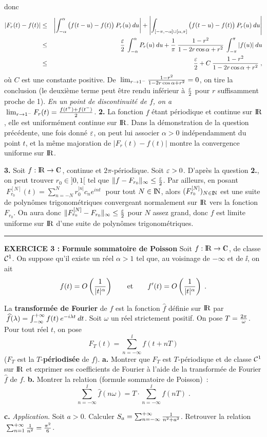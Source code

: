 \documentclass{article}
\begin{document}
donc\vv
\begin{eqnarray*}
|F_r(t)-f(t)| & \leq & \left|\int_{-\alpha}^{\alpha}\big(f(t-u)-f(t)\big)\>P_r(u)\>du\right|+\left|\int_{[-\pi,-\alpha]\cup[\alpha,\pi]}\big(f(t-u)-f(t)\big)\>P_r(u)\>du\right|\\
& \leq & {\varepsilon\over2}\>\int_{-\alpha}^{\alpha}P_r(u)\>du+{1\over\pi}\>{1-r^2\over1-2r\cos\alpha+r^2}\>\int_{-\pi}^{\pi}|f(u)|\>du\\
& \leq & {\varepsilon\over2}+C\>{1-r^2\over1-2r\cos\alpha+r^2}\;,
\end{eqnarray*}
o\`u $C$ est une constante positive. De $\;\lim_{r\rightarrow1^-}{1-r^2\over1-2r\cos\alpha+r^2}=0$, on tire la conclusion (le deuxi\`eme terme peut \^etre rendu inf\'erieur \`a ${\varepsilon\over2}$ pour $r$ suffisamment proche de 1).
\msk\sect
{\it En un point de discontinuit\'e de $f$, on a} $\;\lim_{r\rightarrow1^-}F_r(t)={f(t^+)+f(t^-)\over2}$.
\bsk
{\bf 2.} La fonction $f$ \'etant p\'eriodique et continue sur ${\rm I\kern-0.6mm R}$, elle est uniform\'ement continue sur ${\rm I\kern-0.6mm R}$. Dans la d\'emonstration de la question pr\'ec\'edente, une fois donn\'e $\varepsilon$, on peut lui associer $\alpha>0$ ind\'ependamment du point $t$, et la m\^eme majoration de $|F_r(t)-f(t)|$ montre la convergence uniforme sur ${\rm I\kern-0.6mm R}$.

\msk
{\bf 3.} Soit $f:\rmat\vers\cmat$, continue et $2\pi$-p\'eriodique. Soit $\varepsilon>0$. D'apr\`es la question {\bf 2.}, on peut trouver $r_0\in]0,1[$ tel que $\|f-F_{r_0}\|_{\infty}\leq{\varepsilon\over2}$. Par ailleurs, en posant $\;F_{r_0}^{[N]}(t)=\sum_{n=-N}^Nr_0^{|n|}c_ne^{int}\;$ pour tout $N\in{\rm I\kern-0.5mm N}$, alors $(F_{r_0}^{[N]})_{N\in{\rm I\kern-0.5mm N}}$ est une suite de polyn\^omes trigonom\'etriques convergeant normalement sur ${\rm I\kern-0.6mm R}$ vers la fonction $F_{r_0}$. On aura donc $\|F_{r_0}^{[N]}-F_{r_0}\|_{\infty}\leq{\varepsilon\over2}$ pour $N$ assez grand, donc $f$ est limite uniforme sur ${\rm I\kern-0.6mm R}$ d'une suite de polyn\^omes trigonom\'etriques.


\bsk\hrule\bsk

{\bf EXERCICE 3 :}\msk
{\bf Formule sommatoire de Poisson}\msk
\def\fhat{\widehat{f}}
Soit $f:\rmat\vers\cmat$, de classe ${\cal C}^1$. On suppose qu'il existe
un r\'eel $\alpha>1$ tel que, au voisinage de $-\infty$ et de $\ii$, on ait\vv
$$f(t)=O\left({1\over |t|^{\alpha}}\right)\qquad\hbox{et}\qquad f'(t)=O\left({1\over |t|^{\alpha}
  }\right)\;.$$\par
La {\bf transform\'ee de Fourier} de $f$ est la fonction $\fhat$ d\'efinie sur ${\rm I\kern-0.6mm R}$ par $\;\fhat(\lam)=\int_{-\infty}^{\ii}f(t)\>e^{-i\lam t}\>dt$.\msk
Soit $\omega$ un r\'eel strictement positif. On pose $T={2\pi\over\omega}$. Pour
tout r\'eel $t$, on pose
$$F_T(t)=\sum_{n=-\infty}^{\ii}f(t+nT)$$
($F_T$ est la $T$-{\bf p\'eriodis\'ee} de $f$).\msk
{\bf a.} Montrer que $F_T$ est $T$-p\'eriodique et de classe ${\cal C}^1$ sur ${\rm I\kern-0.6mm R}$
et exprimer ses coefficients de Fourier \`a l'aide de la transform\'ee de
Fourier $\fhat$ de $f$.\msk
{\bf b.} Montrer la relation (formule sommatoire de Poisson)~:\vvvv
$$\sum_{n=-\infty}^{\ii}\fhat(n\omega)=T\cdot
  \sum_{n=-\infty}^{\ii}f(nT)\;.$$\par
{\bf c.} {\it Application}. Soit $a>0$. Calculer $S_a=\sum_{n=-\infty}^{+\infty}
{1\over n^2+a^2}$.\ssk\sect
Retrouver la relation $\;\sum_{n=1}^{+\infty}{1\over n^2}={\pi^2\over6}$.
\end{document}
